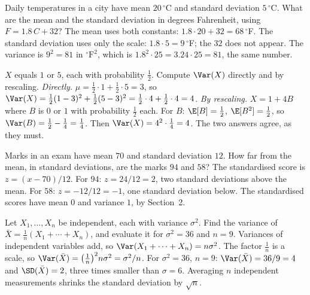 \begin{workedexample}
Daily temperatures in a city have mean $20\,^\circ$C and standard deviation $5\,^\circ$C. What are the mean and the standard deviation in degrees Fahrenheit,
using $F=1.8\,C+32$?
\solution The mean uses both constants: $1.8\cdot20+32=68\,^\circ$F. The standard deviation uses only the scale: $1.8\cdot5=9\,^\circ$F; the $32$ does not appear.
The variance is $9^2=81$ in $^\circ\mathrm{F}^2$, which is $1.8^2\cdot25=3.24\cdot25=81$, the same number.
\end{workedexample}

\begin{workedexample}
$X$ equals $1$ or $5$, each with probability $\tfrac12$. Compute $\Var(X)$ directly and by rescaling.
\solution \emph{Directly.} $\mu=\tfrac12\cdot1+\tfrac12\cdot5=3$, so $\Var(X)=\tfrac12(1-3)^2+\tfrac12(5-3)^2=\tfrac12\cdot4+\tfrac12\cdot4=4$.
\emph{By rescaling.} $X=1+4B$ where $B$ is $0$ or $1$ with probability $\tfrac12$ each. For $B$: $\E[B]=\tfrac12$, $\E[B^2]=\tfrac12$, so
$\Var(B)=\tfrac12-\tfrac14=\tfrac14$. Then $\Var(X)=4^2\cdot\tfrac14=4$. The two answers agree, as they must.
\end{workedexample}

\begin{workedexample}
Marks in an exam have mean $70$ and standard deviation $12$. How far from the mean, in standard deviations, are the marks $94$ and $58$?
\solution The standardised score is $z=(x-70)/12$. For $94$: $z=24/12=2$, two standard deviations above the mean. For $58$: $z=-12/12=-1$, one standard
deviation below. The standardised scores have mean $0$ and variance $1$, by Section~2.
\end{workedexample}

\begin{workedexample}
Let $X_1,\dots,X_n$ be independent, each with variance $\sigma^2$. Find the variance of $\bar X=\tfrac1n(X_1+\cdots+X_n)$, and evaluate it for $\sigma^2=36$ and
$n=9$.
\solution Variances of independent variables add, so $\Var(X_1+\cdots+X_n)=n\sigma^2$. The factor $\tfrac1n$ is a scale, so
$\Var(\bar X)=\bigl(\tfrac1n\bigr)^2 n\sigma^2=\sigma^2/n$. For $\sigma^2=36$, $n=9$: $\Var(\bar X)=36/9=4$ and $\SD(\bar X)=2$, three times smaller than $\sigma=6$.
Averaging $n$ independent measurements shrinks the standard deviation by $\sqrt n$.
\end{workedexample}

